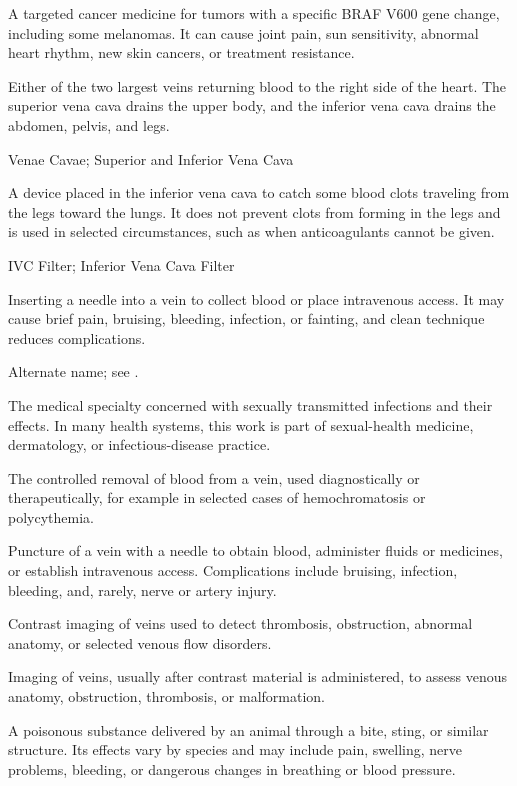  A targeted cancer medicine for tumors with a specific BRAF V600 gene change, including some melanomas. It can cause joint pain, sun sensitivity, abnormal heart rhythm, new skin cancers, or treatment resistance.

 Either of the two largest veins returning blood to the right side of the heart. The superior vena cava drains the upper body, and the inferior vena cava drains the abdomen, pelvis, and legs.

\synonyms
Venae Cavae; Superior and Inferior Vena Cava

 A device placed in the inferior vena cava to catch some blood clots traveling from the legs toward the lungs. It does not prevent clots from forming in the legs and is used in selected circumstances, such as when anticoagulants cannot be given.

\synonyms
IVC Filter; Inferior Vena Cava Filter

 Inserting a needle into a vein to collect blood or place intravenous access. It may cause brief pain, bruising, bleeding, infection, or fainting, and clean technique reduces complications.

 Alternate name; see .

 The medical specialty concerned with sexually transmitted infections and their effects. In many health systems, this work is part of sexual-health medicine, dermatology, or infectious-disease practice.

 The controlled removal of blood from a vein, used diagnostically or therapeutically, for example in selected cases of hemochromatosis or polycythemia.

 Puncture of a vein with a needle to obtain blood, administer fluids or medicines, or establish intravenous access. Complications include bruising, infection, bleeding, and, rarely, nerve or artery injury.

 Contrast imaging of veins used to detect thrombosis, obstruction, abnormal anatomy, or selected venous flow disorders.

 Imaging of veins, usually after contrast material is administered, to assess venous anatomy, obstruction, thrombosis, or malformation.

 A poisonous substance delivered by an animal through a bite, sting, or similar structure. Its effects vary by species and may include pain, swelling, nerve problems, bleeding, or dangerous changes in breathing or blood pressure.

